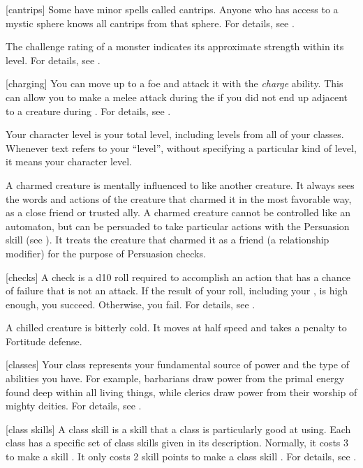 [cantrips] Some  have minor spells called cantrips.
Anyone who has access to a mystic sphere knows all cantrips from that sphere.
For details, see .

 The challenge rating of a monster indicates its approximate strength within its level.
For details, see .

[charging] You can move up to a foe and attack it with the \textit{charge} ability.
This can allow you to make a melee attack during the  if you did not end up adjacent to a creature during .
For details, see .

 Your character level is your total level, including levels from all of your classes.
Whenever text refers to your ``level'', without specifying a particular kind of level, it means your character level.

 A charmed creature is mentally influenced to like another creature.
It always sees the words and actions of the creature that charmed it in the most favorable way, as a close friend or trusted ally.
A charmed creature cannot be controlled like an automaton, but can be persuaded to take particular actions with the Persuasion skill (see ).
It treats the creature that charmed it as a friend (a  relationship modifier) for the purpose of Persuasion checks.

[checks] A check is a d10 roll required to accomplish an action that has a chance of failure that is not an attack.
If the result of your roll, including your , is high enough, you succeed.
Otherwise, you fail.
For details, see .

 A chilled creature is bitterly cold.
It moves at half speed and takes a  penalty to Fortitude defense.

[classes] Your class represents your fundamental source of power and the type of abilities you have.
For example, barbarians draw power from the primal energy found deep within all living things, while clerics draw power from their worship of mighty deities.
For details, see .

[class skills] A class skill is a skill that a class is particularly good at using.
Each class has a specific set of class skills given in its description.
Normally, it costs 3  to make a skill .
It only costs 2 skill points to make a class skill .
For details, see .

